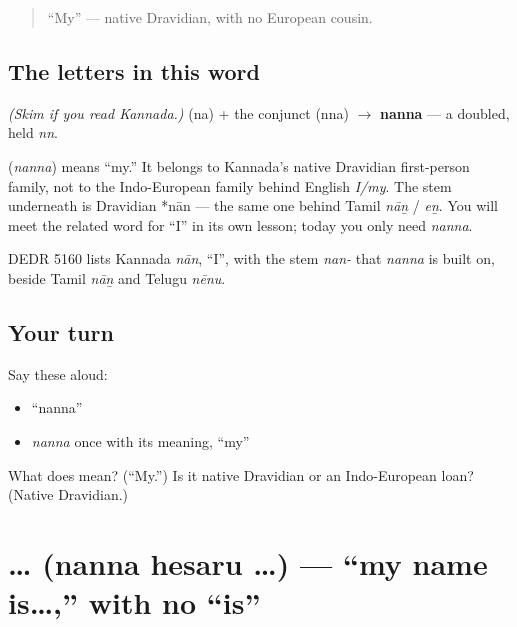\label{lesson:KA-C02-nanna}



\begin{quote}
\textquotedblleft{}My\textquotedblright{} — native Dravidian, with no European cousin.
\end{quote}

\subsection*{The letters in this word}
\emph{(Skim if you read Kannada.)} \textbf{} (na) + the conjunct \textbf{} (nna) $\to$ \textbf{nanna} — a doubled, held \emph{nn}.

\begin{cousinweb}
\textbf{} (\emph{nanna}) means \textquotedblleft{}my.\textquotedblright{} It belongs to Kannada's native Dravidian first-person family, not to the Indo-European family behind English \emph{I/my}. The stem underneath is Dravidian *nān — the same one behind Tamil \emph{nāṉ} / \emph{eṉ}. You will meet the related word for \textquotedblleft{}I\textquotedblright{} in its own lesson; today you only need \emph{nanna}.

DEDR 5160 lists Kannada \emph{nān}, \textquotedblleft{}I\textquotedblright{}, with the stem \emph{nan-} that \emph{nanna} is built on, beside Tamil \emph{nāṉ} and Telugu \emph{nēnu}.
\end{cousinweb}

\subsection*{Your turn}
Say these aloud:

\begin{itemize}
\raggedright
  \item \textquotedblleft{}nanna\textquotedblright{}
  \item \emph{nanna} once with its meaning, \textquotedblleft{}my\textquotedblright{}
\end{itemize}

\begin{tcolorbox}[breakable,colback=teal!4,colframe=teal!35!black,title={Before you move on}]
What does \textbf{} mean? (\textquotedblleft{}My.\textquotedblright{}) Is it native Dravidian or an Indo-European loan? (Native Dravidian.)
\end{tcolorbox}
\section[\texorpdfstring{\kn{ನನ್ನ} \kn{ಹೆಸರು} … (nanna hesaru …)}{ನನ್ನ ಹೆಸರು … (nanna hesaru …)}]{  … (nanna hesaru …) — \textquotedblleft{}my name is…,\textquotedblright{} with no \textquotedblleft{}is\textquotedblright{}}

